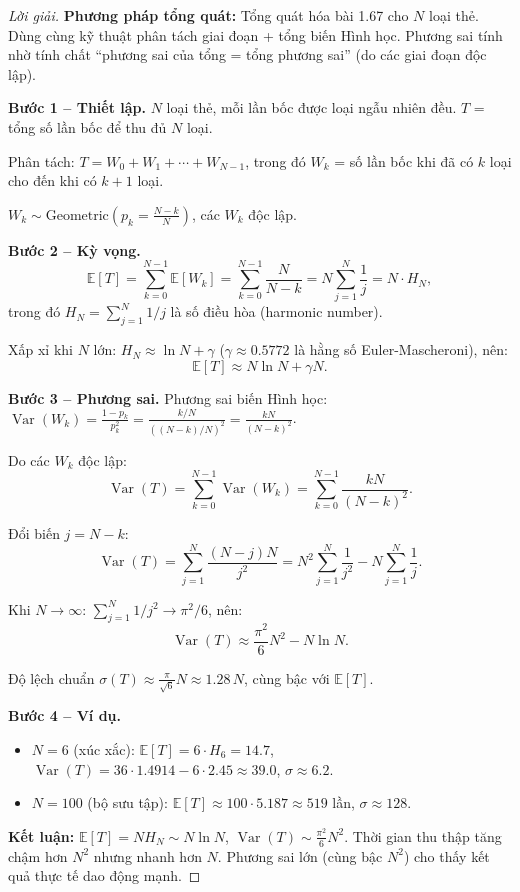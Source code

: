 \documentclass[8pt,a4paper]{article}
\newenvironment{solution}{\begin{proof}[Lời giải]}{\end{proof}}
\newcommand{\E}{\mathbb{E}}
\newcommand{\Var}{\operatorname{Var}}
\begin{document}
\begin{solution}
\textbf{Phương pháp tổng quát:} Tổng quát hóa bài 1.67 cho $N$ loại thẻ. Dùng cùng kỹ thuật phân tách giai đoạn + tổng biến Hình học. Phương sai tính nhờ tính chất ``phương sai của tổng = tổng phương sai'' (do các giai đoạn độc lập).

\textbf{Bước 1 -- Thiết lập.}
$N$ loại thẻ, mỗi lần bốc được loại ngẫu nhiên đều. $T$ = tổng số lần bốc để thu đủ $N$ loại.

Phân tách: $T = W_0 + W_1 + \cdots + W_{N-1}$, trong đó $W_k$ = số lần bốc khi đã có $k$ loại cho đến khi có $k+1$ loại.

$W_k \sim \text{Geometric}\left(p_k = \frac{N-k}{N}\right)$, các $W_k$ độc lập.

\textbf{Bước 2 -- Kỳ vọng.}
\[
  \E[T] = \sum_{k=0}^{N-1} \E[W_k] = \sum_{k=0}^{N-1} \frac{N}{N-k} = N \sum_{j=1}^{N} \frac{1}{j} = N \cdot H_N,
\]
trong đó $H_N = \sum_{j=1}^{N} 1/j$ là số điều hòa (harmonic number).

Xấp xỉ khi $N$ lớn: $H_N \approx \ln N + \gamma$ ($\gamma \approx 0.5772$ là hằng số Euler-Mascheroni), nên:
\[
  \E[T] \approx N \ln N + \gamma N.
\]

\textbf{Bước 3 -- Phương sai.}
Phương sai biến Hình học: $\Var(W_k) = \frac{1-p_k}{p_k^2} = \frac{k/N}{((N-k)/N)^2} = \frac{kN}{(N-k)^2}$.

Do các $W_k$ độc lập:
\[
  \Var(T) = \sum_{k=0}^{N-1} \Var(W_k) = \sum_{k=0}^{N-1} \frac{kN}{(N-k)^2}.
\]

Đổi biến $j = N-k$:
\[
  \Var(T) = \sum_{j=1}^{N} \frac{(N-j)N}{j^2} = N^2 \sum_{j=1}^{N} \frac{1}{j^2} - N \sum_{j=1}^{N} \frac{1}{j}.
\]

Khi $N \to \infty$: $\sum_{j=1}^{N} 1/j^2 \to \pi^2/6$, nên:
\[
  \Var(T) \approx \frac{\pi^2}{6} N^2 - N \ln N.
\]

Độ lệch chuẩn $\sigma(T) \approx \frac{\pi}{\sqrt{6}} N \approx 1.28\, N$, cùng bậc với $\E[T]$.

\textbf{Bước 4 -- Ví dụ.}
\begin{itemize}[nosep]
  \item $N = 6$ (xúc xắc): $\E[T] = 6 \cdot H_6 = 14.7$, $\Var(T) = 36 \cdot 1.4914 - 6 \cdot 2.45 \approx 39.0$, $\sigma \approx 6.2$.
  \item $N = 100$ (bộ sưu tập): $\E[T] \approx 100 \cdot 5.187 \approx 519$ lần, $\sigma \approx 128$.
\end{itemize}

\textbf{Kết luận:} $\E[T] = N H_N \sim N \ln N$, $\Var(T) \sim \frac{\pi^2}{6} N^2$. Thời gian thu thập tăng chậm hơn $N^2$ nhưng nhanh hơn $N$. Phương sai lớn (cùng bậc $N^2$) cho thấy kết quả thực tế dao động mạnh.
\end{solution}
\end{document}
